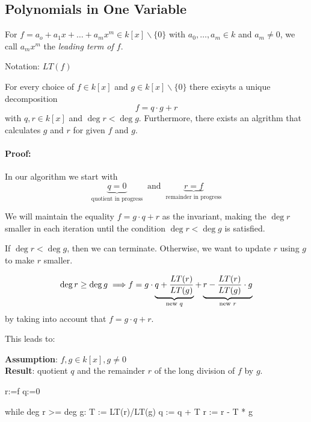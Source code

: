 \subsection{Polynomials in One Variable}

\begin{definition}[title = Definition 1.5.1]
    For $f = a_o + a_1 x + \ldots + a_m x^m \in k[x]\backslash \{0\}$ with $a_0, \ldots, a_m \in k$ and $a_m \neq 0$, we call $a_mx^m$ the \textit{leading term of $f$}.

    Notation: $LT(f)$
\end{definition} 

\begin{proposition}[title = Proposition 1.5.2]
  For every choice of $f \in k[x]$ and $g \in k[x]\backslash \{0\}$ there exisyts a unique decomposition \[f = q \cdot g + r\] with $q,r \in k[x]$ and 
  $\deg r < \deg g$. Furthermore, there exists an algrithm that calculates $g$ and $r$ for given $f$ and $g$.

  \paragraph{Proof:}  In our algorithm we start with 
    \[\underbrace{q =0}_{\text{ quotient in progress }} \text{ and } \underbrace{r = f}_{\text{ remainder in progress }}\] 

    We will maintain the equality $f = g \cdot q + r$ as the invariant, making the $\deg r$ smaller in each iteration until the condition $\deg r < \deg g$ is satisfied. 

    If $\deg r < \deg g$, then we can terminate. Otherwise, we want to update $r$ using $g$ to make $r$ smaller. 

    \[\deg r \geq \deg g  \implies \\
        f  = g \cdot \underbrace{q + \frac{LT(r)}{LT(g)}}_{\text{new } q} + \underbrace{r - \frac{LT(r)}{LT(g)} \cdot g}_{\text{new } r}\]
    by taking into account that $f = g \cdot q + r$. 

    This leads to: 
    \begin{algorithm}[title = Univariate Division Algorithm]
        \textbf{Assumption}: $f,g \in k[x], g \neq 0$  \\
        \textbf{Result}: quotient $q$ and the remainder $r$ of the long division of $f$ by $g$. 
\begin{lstpseudo}
r:=f    %
q:=0    %

while deg r >= deg g:
    T := LT(r)/LT(g)  
    q := q + T   %
    r := r - T * g  %
 

\end{lstpseudo}
\end{algorithm}
\end{proposition}
